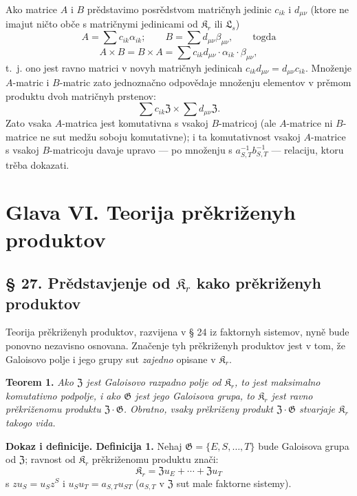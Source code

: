 \documentclass[11pt]{article}
\begin{document}
Ako matrice \(A\) i \(B\) prědstavimo posrědstvom matričnyh jedinic \(c_{ik}\) i \(d_{\mu\nu}\) (ktore ne imajut ničto obče s matričnymi jedinicami od \(\mathfrak K_r\) ili \(\mathfrak L_s\))
\[
A=\sum c_{ik}\alpha_{ik};\qquad
B=\sum d_{\mu\nu}\beta_{\mu\nu},\qquad\text{togda}
\]
\[
A\times B=B\times A
=\sum c_{ik}d_{\mu\nu}\cdot\alpha_{ik}\cdot\beta_{\mu\nu},
\]
t.~j. ono jest ravno matrici v novyh matričnyh jedinicah
\(c_{ik}d_{\mu\nu}=d_{\mu\nu}c_{ik}\). Množenje \(A\)-matric i \(B\)-matric zato jednoznačno odpovědaje množenju elementov v prěmom produktu dvoh matričnyh prstenov:
\[
\sum c_{ik}\mathfrak Z\times\sum d_{\mu\nu}\mathfrak Z.
\]
Zato vsaka \(A\)-matrica jest komutativna s vsakoj \(B\)-matricoj (ale \(A\)-matrice ni \(B\)-matrice ne sut medžu soboju komutativne); i ta komutativnost vsakoj \(A\)-matrice s vsakoj \(B\)-matricoju davaje upravo --- po množenju s \(a_{S,T}^{-1}b_{S,T}^{-1}\) --- relaciju, ktoru trěba dokazati.

\section*{Glava VI. Teorija prěkriženyh produktov}\label{kapitel-vi.-theorie-der-verschraenkten-produkte}

\subsection*{§ 27. Prědstavjenje od \(\mathfrak K_r\) kako prěkriženyh produktov}

Teorija prěkriženyh produktov, razvijena v § 24 iz faktornyh sistemov, nyně bude ponovno nezavisno osnovana. Značenje tyh prěkriženyh produktov jest v tom, že Galoisovo polje i jego grupy sut \emph{zajedno} opisane v \(\mathfrak K_r\).

\noindent\textbf{Teorem 1.} \emph{Ako \(\mathfrak Z\) jest Galoisovo razpadno polje od \(\mathfrak K_r\), to jest maksimalno komutativno podpolje, i ako \(\mathfrak G\) jest jego Galoisova grupa, to \(\mathfrak K_r\) jest ravno prěkriženomu produktu \(\mathfrak Z\cdot\mathfrak G\). Obratno, vsaky prěkriženy produkt \(\mathfrak Z\cdot\mathfrak G\) stvarjaje \(\mathfrak K_r\) takogo vida.}

\noindent\textbf{Dokaz i definicije. Definicija 1.} Nehaj \(\mathfrak G=\{E,S,\ldots,T\}\) bude Galoisova grupa od \(\mathfrak Z\); ravnost od \(\mathfrak K_r\) prěkriženomu produktu znači:
\[
\mathfrak K_r=\mathfrak Zu_E+\cdots+\mathfrak Zu_T
\]
s \(zu_S=u_Sz^S\) i \(u_Su_T=a_{S,T}u_{ST}\) (\(a_{S,T}\) v \(\mathfrak Z\) sut male faktorne sistemy).
\end{document}
